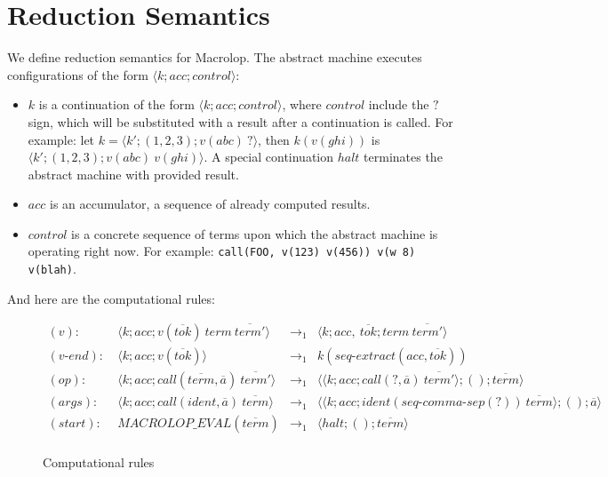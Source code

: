 \documentclass[a4paper, 12pt]{article}
\theoremstyle{break}
\begin{document}
\section{Reduction Semantics}

We define reduction semantics for Macrolop. The abstract machine executes configurations
of the form $\langle k; acc; control \rangle$:

\begin{itemize}
    \item $k$ is a continuation of the form $\langle k; acc; control \rangle$, where
    $control$ include the $?$ sign, which will be substituted with a result after a
    continuation is called. For example: let $k = \langle k'; (1, 2, 3); v(abc) \ ? \rangle$,
    then $k(v(ghi))$ is $\langle k'; (1, 2, 3); v(abc) \ v(ghi) \rangle$. A special
    continuation $halt$ terminates the abstract machine with provided result.

    \item $acc$ is an accumulator, a sequence of already computed results.

    \item $control$ is a concrete sequence of terms upon which the abstract machine is
    operating right now. For example: \texttt{call(FOO, v(123) v(456)) v(w 8) v(blah)}.
\end{itemize}

And here are the computational rules:

\begin{figure}[H]
    \caption{Computational rules}

    \begin{align*}
        (v): \ & \langle k; acc; v(\overline{tok}) \ term \ \overline{term'} \rangle & \to_1 &
            \langle k; acc, \ \overline{tok}; term \ \overline{term'} \rangle \\
        (v\mbox{-}end): \ & \langle k; acc; v(\overline{tok}) \rangle & \to_1 &
            k(seq\mbox{-}extract(acc, \overline{tok})) \\
        (op): \ & \langle k; acc; call(\overline{term}, \overline{a}) \ \overline{term'} \rangle & \to_1 &
            \langle \langle k; acc; call(?, \overline{a}) \ \overline{term'} \rangle; (); \overline{term} \rangle \\
        (args): \ & \langle k; acc; call(ident, \overline{a}) \ \overline{term} \rangle & \to_1 &
            \langle \langle k; acc; ident(seq\mbox{-}comma\mbox{-}sep(?)) \ \overline{term} \rangle; (); \overline{a} \rangle \\
        (start): \ & MACROLOP\_EVAL(\overline{term}) & \to_1 &
            \langle halt; (); \overline{term} \rangle \\
    \end{align*}
\end{figure}
\end{document}
